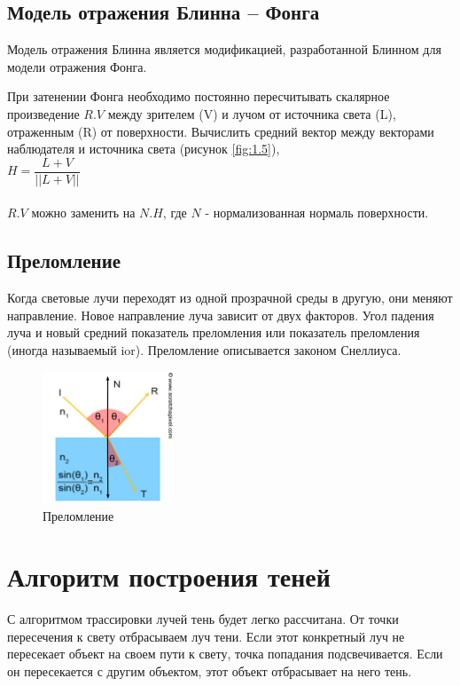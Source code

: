 \subsection*{Модель отражения Блинна – Фонга}

Модель отражения Блинна является модификацией, разработанной Блинном для модели отражения Фонга.

При затенении Фонга необходимо постоянно пересчитывать скалярное произведение $R.V$ между зрителем (V) и лучом от источника света (L), отраженным (R) от поверхности.
Вычислить средний вектор между векторами наблюдателя и источника света (рисунок \ref{fig:1.5}),
\\

$H = \dfrac{L + V}{||L + V||}$\\\\
$R.V$ можно заменить на $N.H$, где $N$ - нормализованная нормаль поверхности.



\subsection*{Преломление}
Когда световые лучи переходят из одной прозрачной среды в другую, они меняют направление. Новое направление луча зависит от двух факторов. Угол падения луча и новый средний показатель преломления или показатель преломления (иногда называемый ior).
Преломление описывается законом Снеллиуса.

\begin{figure}[ht]
  \centering
  \includegraphics[height=0.3\textwidth, width=0.35\textwidth]{img/refraction.png}
  \caption{Преломление}
\end{figure}


\section{Алгоритм построения теней}

С алгоритмом трассировки лучей тень будет легко рассчитана.
От точки пересечения к свету отбрасываем луч тени. Если этот конкретный луч не пересекает объект на своем пути к свету, точка попадания подсвечивается. Если он пересекается с другим объектом, этот объект отбрасывает на него тень.

